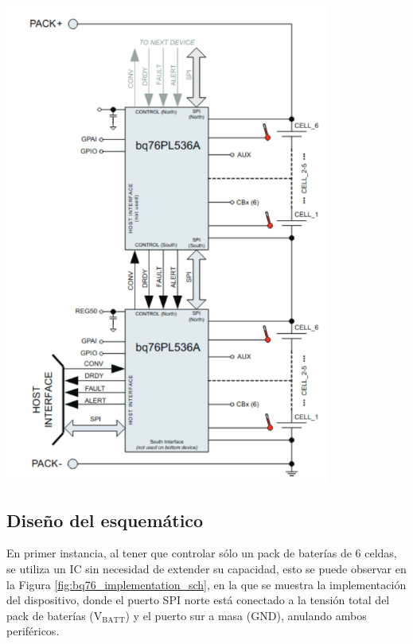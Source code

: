 \documentclass[10pt, a4paper]{report}
\begin{document}
\begin{minipage}{0.5\textwidth}
    \begin{center}
        \includegraphics[width=0.8\textwidth]{bq76_simplified_schematic.png}
        \label{bq76_simplified_schematic}
    \end{center}
\end{minipage}

\subsection{Diseño del esquem\'atico}

En primer instancia, al tener que controlar s\'olo un pack de bater\'ias de 6
celdas, se utiliza un \acrshort{IC} sin necesidad de extender su capacidad, 
esto se puede observar en la Figura \ref{fig:bq76_implementation_sch}, en la que 
se muestra la implementaci\'on del dispositivo, donde el puerto \acrshort{SPI} 
norte est\'a conectado a la tensi\'on total del pack de bater\'ias 
($\mathrm{V_{BATT}}$) y el puerto sur a masa ($\mathrm{GND}$), anulando ambos 
perif\'ericos.
\end{document}

